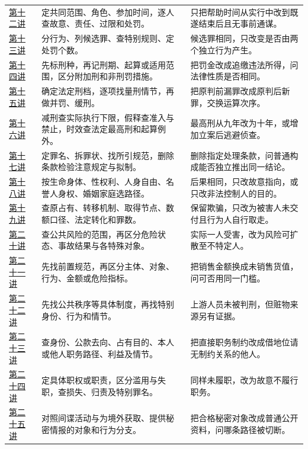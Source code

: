 \begin{longtable}{@{}p{.12\linewidth}p{.42\linewidth}p{.40\linewidth}@{}}
\hyperref[lecture:12]{第十二讲} & 定共同范围、角色、参加时间，逐人查故意、责任、过限和处罚。 & 只把帮助时间从实行中改到既遂结束后且无事前通谋。\\
\hyperref[lecture:13]{第十三讲} & 分行为、列候选罪、查特别规则、定处罚个数。 & 候选罪相同，只改变是否由两个独立行为产生。\\
\hyperref[lecture:14]{第十四讲} & 先标刑种，再记刑期、起算或适用范围，区分附加刑和非刑罚措施。 & 把罚金改成追缴违法所得，问法律性质是否相同。\\
\hyperref[lecture:15]{第十五讲} & 确定法定刑档，逐项找量刑情节，再做并罚、缓刑。 & 把原判前漏罪改成原判后新罪，交换运算次序。\\
\hyperref[lecture:16]{第十六讲} & 减刑查实际执行下限，假释查准入与禁止，时效查法定最高刑和起算例外。 & 最高刑从九年改为十年，或增加立案后逃避侦查。\\
\hyperref[lecture:17]{第十七讲} & 定罪名、拆罪状、找所引规范，删除条款检验注意规定与拟制。 & 删除指定处理条款，问普通构成能否独立推出同一结论。\\
\hyperref[lecture:18]{第十八讲} & 按生命身体、性权利、人身自由、名誉人身权、婚姻家庭选路径。 & 后果相同，只改故意指向，或只改非法控制人的目的。\\
\hyperref[lecture:19]{第十九讲} & 查原占有、转移机制、取得节点、数额口径、法定转化和罪数。 & 保留欺骗，只改为被害人未交付且行为人自行取走。\\
\hyperref[lecture:20]{第二十讲} & 查公共风险的范围，再区分危险状态、事故结果与各特殊对象。 & 实际一人受害，改为风险可扩散至不特定人。\\
\hyperref[lecture:21]{第二十一讲} & 先找前置规范，再区分主体、对象、行为、金额或危险指标。 & 把销售金额换成未销售货值，问可否用同一门槛。\\
\hyperref[lecture:22]{第二十二讲} & 先找公共秩序等具体制度，再找特别身份、行为和情节。 & 上游人员未被判刑，但赃物来源另有证据。\\
\hyperref[lecture:23]{第二十三讲} & 查身份、公款去向、占有目的、本人或他人职务路径、利益及情节。 & 把直接职务制约改成借地位请无制约关系的他人。\\
\hyperref[lecture:24]{第二十四讲} & 定具体职权或职责，区分滥用与失职，查损失、归责及特别罪名。 & 同样未履职，改为故意不履行职务。\\
\hyperref[lecture:25]{第二十五讲} & 对照间谍活动与为境外获取、提供秘密情报的对象和行为分支。 & 把合格秘密对象改成普通公开资料，问哪条路径被切断。\\
\end{longtable}
\endgroup
